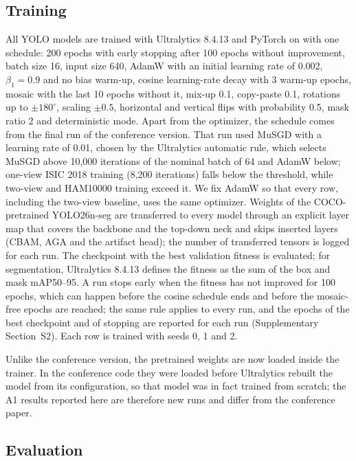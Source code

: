 \subsection{Training}
All YOLO models are trained with Ultralytics 8.4.13 and PyTorch  on  with one schedule: 200 epochs with early stopping after 100 epochs without improvement, batch size 16, input size 640, AdamW with an initial learning rate of 0.002, $\beta_1=0.9$ and no bias warm-up, cosine learning-rate decay with 3 warm-up epochs, mosaic with the last 10 epochs without it, mix-up 0.1, copy-paste 0.1, rotations up to $\pm180^\circ$, scaling $\pm0.5$, horizontal and vertical flips with probability 0.5, mask ratio 2 and deterministic mode. Apart from the optimizer, the schedule comes from the final run of the conference version. That run used MuSGD with a learning rate of 0.01, chosen by the Ultralytics automatic rule, which selects MuSGD above 10,000 iterations of the nominal batch of 64 and AdamW below; one-view ISIC 2018 training (8,200 iterations) falls below the threshold, while two-view and HAM10000 training exceed it. We fix AdamW so that every row, including the two-view baseline, uses the same optimizer. Weights of the COCO-pretrained YOLO26n-seg are transferred to every model through an explicit layer map that covers the backbone and the top-down neck and skips inserted layers (CBAM, AGA and the artifact head); the number of transferred tensors is logged for each run. The checkpoint with the best validation fitness is evaluated; for segmentation, Ultralytics 8.4.13 defines the fitness as the sum of the box and mask mAP50--95. A run stops early when the fitness has not improved for 100 epochs, which can happen before the cosine schedule ends and before the mosaic-free epochs are reached; the same rule applies to every run, and the epochs of the best checkpoint and of stopping are reported for each run (Supplementary Section~S2). Each row is trained with seeds 0, 1 and 2.

Unlike the conference version, the pretrained weights are now loaded inside the trainer. In the conference code they were loaded before Ultralytics rebuilt the model from its configuration, so that model was in fact trained from scratch; the A1 results reported here are therefore new runs and differ from the conference paper.

\subsection{Evaluation}
